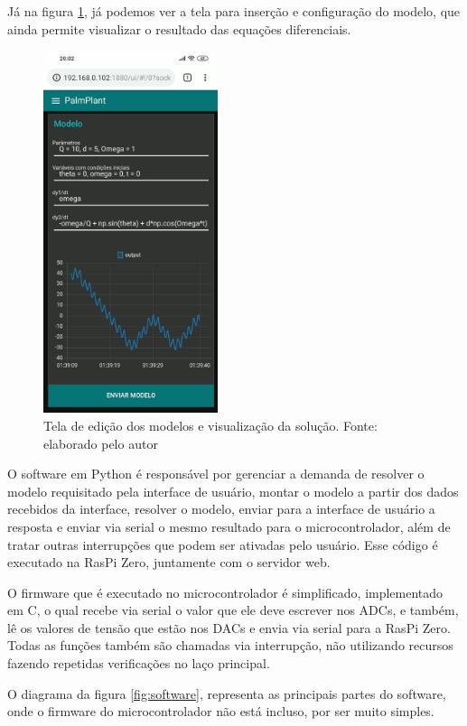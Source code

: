 \documentclass[journal]{IEEEtranTIE}
\begin{document}
Já na figura \ref{fig:running}, já podemos ver a tela para inserção e configuração do modelo, que ainda permite visualizar o resultado das equações diferenciais.

\begin{figure}[!h]
	\centering
	\includegraphics[width=5.1cm]{img/running.png}
    \caption{Tela de edição dos modelos e visualização da solução. Fonte: elaborado pelo autor}
    \label{fig:running}
\end{figure}

O software em Python é responsável por gerenciar a demanda de resolver o modelo requisitado pela interface de usuário, montar o modelo a partir dos dados recebidos da interface, resolver o modelo, enviar para a interface de usuário a resposta e enviar via serial o mesmo resultado para o microcontrolador, além de tratar outras interrupções que podem ser ativadas pelo usuário. Esse código é executado na RasPi Zero, juntamente com o servidor web.

O firmware que é executado no microcontrolador é simplificado, implementado em C, o qual recebe via serial o valor que ele deve escrever nos ADCs, e também, lê os valores de tensão que estão nos DACs e envia via serial para a RasPi Zero. Todas as funções também são chamadas via interrupção, não utilizando recursos fazendo repetidas verificações no laço principal.

O diagrama da figura \ref{fig:software}, representa as principais partes do software, onde o firmware do microcontrolador não está incluso, por ser muito simples.
\end{document}
